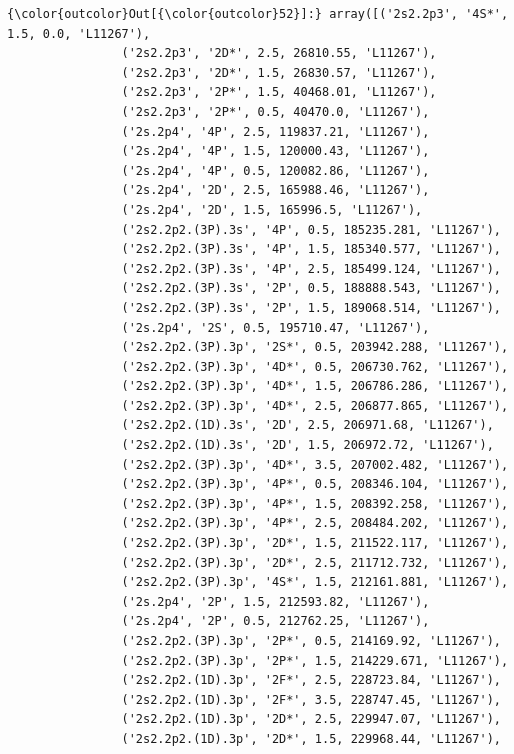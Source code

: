 \documentclass{report}
\begin{document}
            \begin{Verbatim}[commandchars=\\\{\}]
{\color{outcolor}Out[{\color{outcolor}52}]:} array([('2s2.2p3', '4S*', 1.5, 0.0, 'L11267'),
                ('2s2.2p3', '2D*', 2.5, 26810.55, 'L11267'),
                ('2s2.2p3', '2D*', 1.5, 26830.57, 'L11267'),
                ('2s2.2p3', '2P*', 1.5, 40468.01, 'L11267'),
                ('2s2.2p3', '2P*', 0.5, 40470.0, 'L11267'),
                ('2s.2p4', '4P', 2.5, 119837.21, 'L11267'),
                ('2s.2p4', '4P', 1.5, 120000.43, 'L11267'),
                ('2s.2p4', '4P', 0.5, 120082.86, 'L11267'),
                ('2s.2p4', '2D', 2.5, 165988.46, 'L11267'),
                ('2s.2p4', '2D', 1.5, 165996.5, 'L11267'),
                ('2s2.2p2.(3P).3s', '4P', 0.5, 185235.281, 'L11267'),
                ('2s2.2p2.(3P).3s', '4P', 1.5, 185340.577, 'L11267'),
                ('2s2.2p2.(3P).3s', '4P', 2.5, 185499.124, 'L11267'),
                ('2s2.2p2.(3P).3s', '2P', 0.5, 188888.543, 'L11267'),
                ('2s2.2p2.(3P).3s', '2P', 1.5, 189068.514, 'L11267'),
                ('2s.2p4', '2S', 0.5, 195710.47, 'L11267'),
                ('2s2.2p2.(3P).3p', '2S*', 0.5, 203942.288, 'L11267'),
                ('2s2.2p2.(3P).3p', '4D*', 0.5, 206730.762, 'L11267'),
                ('2s2.2p2.(3P).3p', '4D*', 1.5, 206786.286, 'L11267'),
                ('2s2.2p2.(3P).3p', '4D*', 2.5, 206877.865, 'L11267'),
                ('2s2.2p2.(1D).3s', '2D', 2.5, 206971.68, 'L11267'),
                ('2s2.2p2.(1D).3s', '2D', 1.5, 206972.72, 'L11267'),
                ('2s2.2p2.(3P).3p', '4D*', 3.5, 207002.482, 'L11267'),
                ('2s2.2p2.(3P).3p', '4P*', 0.5, 208346.104, 'L11267'),
                ('2s2.2p2.(3P).3p', '4P*', 1.5, 208392.258, 'L11267'),
                ('2s2.2p2.(3P).3p', '4P*', 2.5, 208484.202, 'L11267'),
                ('2s2.2p2.(3P).3p', '2D*', 1.5, 211522.117, 'L11267'),
                ('2s2.2p2.(3P).3p', '2D*', 2.5, 211712.732, 'L11267'),
                ('2s2.2p2.(3P).3p', '4S*', 1.5, 212161.881, 'L11267'),
                ('2s.2p4', '2P', 1.5, 212593.82, 'L11267'),
                ('2s.2p4', '2P', 0.5, 212762.25, 'L11267'),
                ('2s2.2p2.(3P).3p', '2P*', 0.5, 214169.92, 'L11267'),
                ('2s2.2p2.(3P).3p', '2P*', 1.5, 214229.671, 'L11267'),
                ('2s2.2p2.(1D).3p', '2F*', 2.5, 228723.84, 'L11267'),
                ('2s2.2p2.(1D).3p', '2F*', 3.5, 228747.45, 'L11267'),
                ('2s2.2p2.(1D).3p', '2D*', 2.5, 229947.07, 'L11267'),
                ('2s2.2p2.(1D).3p', '2D*', 1.5, 229968.44, 'L11267'),

\end{Verbatim}
\end{document}

